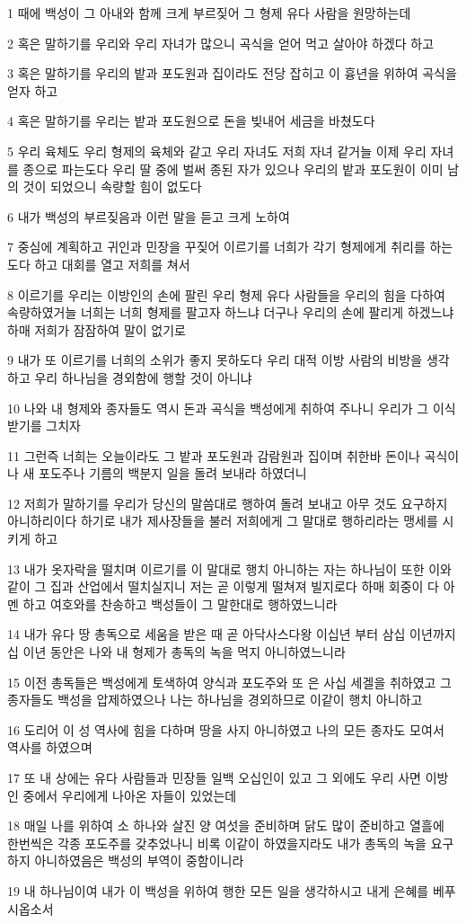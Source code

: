 \par 1 때에 백성이 그 아내와 함께 크게 부르짖어 그 형제 유다 사람을 원망하는데
\par 2 혹은 말하기를 우리와 우리 자녀가 많으니 곡식을 얻어 먹고 살아야 하겠다 하고
\par 3 혹은 말하기를 우리의 밭과 포도원과 집이라도 전당 잡히고 이 흉년을 위하여 곡식을 얻자 하고
\par 4 혹은 말하기를 우리는 밭과 포도원으로 돈을 빚내어 세금을 바쳤도다
\par 5 우리 육체도 우리 형제의 육체와 같고 우리 자녀도 저희 자녀 같거늘 이제 우리 자녀를 종으로 파는도다 우리 딸 중에 벌써 종된 자가 있으나 우리의 밭과 포도원이 이미 남의 것이 되었으니 속량할 힘이 없도다
\par 6 내가 백성의 부르짖음과 이런 말을 듣고 크게 노하여
\par 7 중심에 계획하고 귀인과 민장을 꾸짖어 이르기를 너희가 각기 형제에게 취리를 하는도다 하고 대회를 열고 저희를 쳐서
\par 8 이르기를 우리는 이방인의 손에 팔린 우리 형제 유다 사람들을 우리의 힘을 다하여 속량하였거늘 너희는 너희 형제를 팔고자 하느냐 더구나 우리의 손에 팔리게 하겠느냐 하매 저희가 잠잠하여 말이 없기로
\par 9 내가 또 이르기를 너희의 소위가 좋지 못하도다 우리 대적 이방 사람의 비방을 생각하고 우리 하나님을 경외함에 행할 것이 아니냐
\par 10 나와 내 형제와 종자들도 역시 돈과 곡식을 백성에게 취하여 주나니 우리가 그 이식 받기를 그치자
\par 11 그런즉 너희는 오늘이라도 그 밭과 포도원과 감람원과 집이며 취한바 돈이나 곡식이나 새 포도주나 기름의 백분지 일을 돌려 보내라 하였더니
\par 12 저희가 말하기를 우리가 당신의 말씀대로 행하여 돌려 보내고 아무 것도 요구하지 아니하리이다 하기로 내가 제사장들을 불러 저희에게 그 말대로 행하리라는 맹세를 시키게 하고
\par 13 내가 옷자락을 떨치며 이르기를 이 말대로 행치 아니하는 자는 하나님이 또한 이와 같이 그 집과 산업에서 떨치실지니 저는 곧 이렇게 떨쳐져 빌지로다 하매 회중이 다 아멘 하고 여호와를 찬송하고 백성들이 그 말한대로 행하였느니라
\par 14 내가 유다 땅 총독으로 세움을 받은 때 곧 아닥사스다왕 이십년 부터 삼십 이년까지 십 이년 동안은 나와 내 형제가 총독의 녹을 먹지 아니하였느니라
\par 15 이전 총독들은 백성에게 토색하여 양식과 포도주와 또 은 사십 세겔을 취하였고 그 종자들도 백성을 압제하였으나 나는 하나님을 경외하므로 이같이 행치 아니하고
\par 16 도리어 이 성 역사에 힘을 다하며 땅을 사지 아니하였고 나의 모든 종자도 모여서 역사를 하였으며
\par 17 또 내 상에는 유다 사람들과 민장들 일백 오십인이 있고 그 외에도 우리 사면 이방인 중에서 우리에게 나아온 자들이 있었는데
\par 18 매일 나를 위하여 소 하나와 살진 양 여섯을 준비하며 닭도 많이 준비하고 열흘에 한번씩은 각종 포도주를 갖추었나니 비록 이같이 하였을지라도 내가 총독의 녹을 요구하지 아니하였음은 백성의 부역이 중함이니라
\par 19 내 하나님이여 내가 이 백성을 위하여 행한 모든 일을 생각하시고 내게 은혜를 베푸시옵소서

